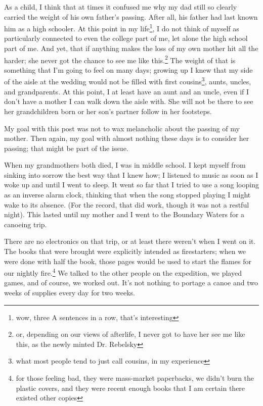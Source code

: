 \documentclass[12pt]{article}
\renewcommand{\,}{\textsuperscript{,}}
\begin{document}
As a child, I think that at times it confused me why my dad still so clearly carried the weight of his own father's passing.  
After all, his father had last known him as a high schooler.  
At this point in my life\footnote{wow, three A sentences in a row, that's interesting}, I do not think of myself as particularly connected to even the college part of me, let alone the high school part of me.  
And yet, that if anything makes the loss of my own mother hit all the harder; she never got the chance to see me like this.\footnote{or, depending on our views of afterlife, I never got to have her see me like this, as the newly minted Dr. Rebelsky}  
The weight of that is something that I'm going to feel on many days; growing up I knew that my side of the aisle at the wedding would not be filled with first cousins\footnote{what most people tend to just call cousins, in my experience}, aunts, uncles, and grandparents.  
At this point, I at least have an aunt and an uncle, even if I don't have a mother I can walk down the aisle with.  
She will not be there to see her grandchildren born or her son's partner follow in her footsteps.

My goal with this post was not to wax melancholic about the passing of my mother.  
Then again, my goal with almost nothing these days is to consider her passing; that might be part of the issue.

When my grandmothers both died, I was in middle school.  
I kept myself from sinking into sorrow the best way that I knew how; I listened to music as soon as I woke up and until I went to sleep.  
It went so far that I tried to use a song looping as an inverse alarm clock, thinking that when the song stopped playing I might wake to its absence.  
(For the record, that did work, though it was not a restful night).  
This lasted until my mother and I went to the Boundary Waters for a canoeing trip.

There are no electronics on that trip, or at least there weren't when I went on it.  
The books that were brought were explicitly intended as firestarters; when we were done with half the book, those pages would be used to start the flames for our nightly fire.\footnote{for those feeling bad, they were mass-market paperbacks, we didn't burn the plastic covers, and they were recent enough books that I am certain there existed other copies}  
We talked to the other people on the expedition, we played games, and of course, we worked out.  
It's not nothing to portage a canoe and two weeks of supplies every day for two weeks.
\end{document}
